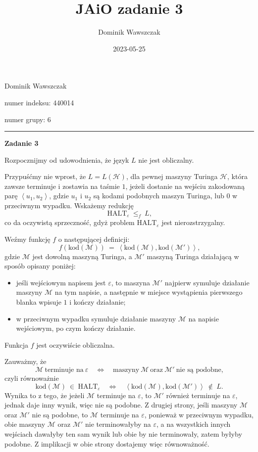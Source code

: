 \documentclass[12pt]{article}
\title{JAiO zadanie 3}
\author{Dominik Wawszczak}
\date{2023-05-25}
\begin{document}
	\setlength{\parindent}{0 cm}
	
	Dominik Wawszczak
	
	numer indeksu: 440014
	
	numer grupy: 6
	
	\bigskip
	\hrule
	\bigskip
	
	\textbf{Zadanie 3}
	
	\medskip
	
	Rozpocznijmy od udowodnienia, że język \(L\) nie jest obliczalny.
	
	\medskip
	
	Przypuśćmy nie wprost, że \(L = L \left( \mathcal{H} \right)\), dla pewnej
	maszyny Turinga \(\mathcal{H}\), która zawsze terminuje i zostawia na taśmie
	\(1\), jeżeli dostanie na wejściu zakodowaną parę \(\left\langle u_{1},
	u_{2} \right\rangle\), gdzie \(u_{1}\) i \(u_{2}\) są kodami podobnych
	maszyn Turinga, lub \(0\) w przeciwnym wypadku. Wskażemy redukcję
	\[ \text{HALT}_{\varepsilon} \ \leqslant_{f} \ L \text{,} \]
	co da oczywistą sprzeczność, gdyż problem \(\text{HALT}_{\varepsilon}\) jest
	nierozstrzygalny.
	
	\medskip
	
	Weźmy funkcję \(f\) o następującej definicji:
	\[ f \left( \text{kod} \left( \mathcal{M} \right) \right) \ = \ \left\langle
	\text{kod} \left( \mathcal{M} \right), \text{kod} \left( \mathcal{M}'
	\right) \right\rangle \text{,} \]
	gdzie \(\mathcal{M}\) jest dowolną maszyną Turinga, a \(\mathcal{M}'\)
	maszyną Turinga działającą w sposób opisany poniżej:
	\begin{itemize}
		\item jeśli wejściowym napisem jest \(\varepsilon\), to maszyna
		      \(\mathcal{M}'\) najpierw symuluje działanie maszyny
		      \(\mathcal{M}\) na tym napisie, a następnie w miejsce wystąpienia
		      pierwszego blanka wpisuje \(1\) i kończy działanie;
		\item w przeciwnym wypadku symuluje działanie maszyny \(\mathcal{M}\) na
		      napisie wejściowym, po czym kończy działanie.
	\end{itemize}
	Funkcja \(f\) jest oczywiście obliczalna.
	
	\medskip
	
	Zauważmy, że
	\[ \mathcal{M} \ \text{terminuje na} \ \varepsilon \quad \iff \quad
	\text{maszyny} \ \mathcal{M} \ \text{oraz} \ \mathcal{M}' \ \text{nie są
	podobne,} \]
	czyli równoważnie
	\[ \text{kod} \left( \mathcal{M} \right) \ \in \ \text{HALT}_{\varepsilon}
	\quad \iff \quad \left\langle \text{kod} \left( \mathcal{M} \right),
	\text{kod} \left( \mathcal{M}' \right) \right\rangle \ \notin \ L
	\text{.} \]
	Wynika to z tego, że jeżeli \(\mathcal{M}\) terminuje na \(\varepsilon\),
	to \(\mathcal{M}'\) również terminuje na \(\varepsilon\), jednak daje inny
	wynik, więc nie są podobne. Z drugiej strony, jeśli maszyny \(\mathcal{M}\)
	oraz \(\mathcal{M}'\) nie są podobne, to \(\mathcal{M}\) terminuje na
	\(\varepsilon\), ponieważ w przeciwnym wypadku, obie maszyny \(\mathcal{M}\)
	oraz \(\mathcal{M}'\) nie terminowałyby na \(\varepsilon\), a na wszystkich
	innych wejściach dawałyby ten sam wynik lub obie by nie terminowały, zatem
	byłyby podobne. Z implikacji w obie strony dostajemy więc równoważność.
	
\end{document}
